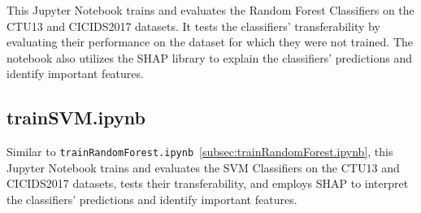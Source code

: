 This Jupyter Notebook trains and evaluates the Random Forest Classifiers on the CTU13 and CICIDS2017 datasets. It tests the classifiers' transferability by evaluating their performance on the dataset for which they were not trained. The notebook also utilizes the SHAP library to explain the classifiers' predictions and identify important features.

\subsection{trainSVM.ipynb}\label{subsec:trainSVM.ipynb}

Similar to \texttt{trainRandomForest.ipynb}~\ref{subsec:trainRandomForest.ipynb}, this Jupyter Notebook trains and evaluates the SVM Classifiers on the CTU13 and CICIDS2017 datasets, tests their transferability, and employs SHAP to interpret the classifiers' predictions and identify important features.